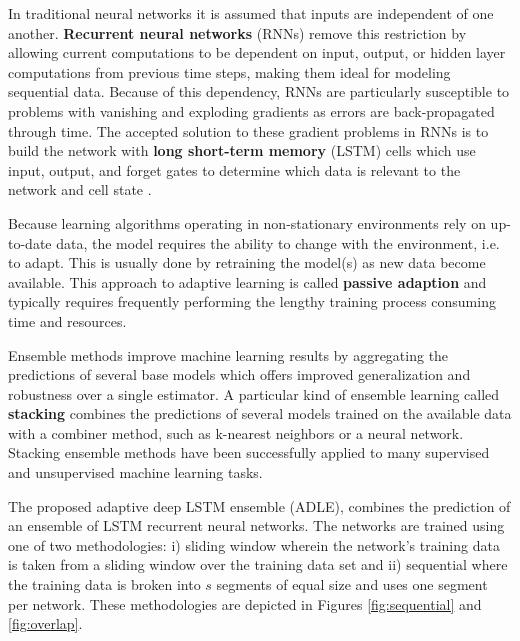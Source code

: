 \documentclass{article}
\begin{document}
In traditional neural networks it is assumed that inputs are independent of one another. \textbf{Recurrent neural networks} (RNNs) remove this restriction by allowing current computations to be dependent on input, output, or hidden layer computations from previous time steps, making them ideal for modeling sequential data. Because of this dependency, RNNs are particularly susceptible to problems with vanishing and exploding gradients as errors are back-propagated through time. The accepted solution to these gradient problems in RNNs is to build the network with \textbf{long short-term memory} (LSTM) cells which use input, output, and forget gates to determine which data is relevant to the network and cell state \citep{hochreiter1997long}.

Because learning algorithms operating in non-stationary environments rely on up-to-date data, the model requires the ability to change with the environment, i.e. to adapt. This is usually done by retraining the model(s) as new data become available. This approach to adaptive learning is called \textbf{passive adaption} and typically requires frequently performing the lengthy training process consuming time and resources.

Ensemble methods improve machine learning results by aggregating the predictions of several base models which offers improved generalization and robustness over a single estimator. A particular kind of ensemble learning called \textbf{stacking} combines the predictions of several models trained on the available data with a combiner method, such as k-nearest neighbors or a neural network. Stacking ensemble methods have been successfully applied to many supervised and unsupervised machine learning tasks.

The proposed adaptive deep LSTM ensemble (ADLE), combines the prediction of an ensemble of LSTM recurrent neural networks. The networks are trained using one of two methodologies: i) sliding window wherein the network's training data is taken from a sliding window over the training data set and ii) sequential where the training data is broken into $s$ segments of equal size and uses one segment per network. These methodologies are depicted in Figures \ref{fig:sequential} and \ref{fig:overlap}. %
\end{document}
